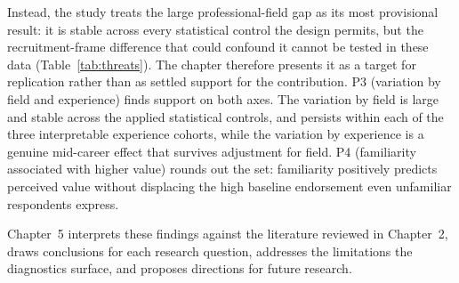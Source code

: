 Instead, the study treats the large professional-field gap as its most provisional result: it is stable across every statistical control the design permits, but the recruitment-frame difference that could confound it cannot be tested in these data (Table~\ref{tab:threats}). The chapter therefore presents it as a target for replication rather than as settled support for the contribution. P3 (variation by field and experience) finds support on both axes. The variation by field is large and stable across the applied statistical controls, and persists within each of the three interpretable experience cohorts, while the variation by experience is a genuine mid-career effect that survives adjustment for field. P4 (familiarity associated with higher value) rounds out the set: familiarity positively predicts perceived value without displacing the high baseline endorsement even unfamiliar respondents express.

Chapter~5 interprets these findings against the literature reviewed in Chapter~2, draws conclusions for each research question, addresses the limitations the diagnostics surface, and proposes directions for future research.
